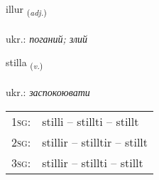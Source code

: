 \documentclass[frontgrid, backgrid]{flacards}\usepackage[]{graphicx}\usepackage[]{xcolor}
\begin{document}
\renewcommand{\flhead}{\vskip5pt \fboxsep=0pt {\small\bfseries\footnotesize Lýsingarorð | прикметник}}
\renewcommand{\fcfoot}{\vskip5pt \fboxsep=0pt \hspace{2pt}{\small\bfseries\footnotesize 2K}}

\renewcommand{\blhead}{\vskip5pt {\small\bfseries\footnotesize Lýsingarorð | прикметник }}
\renewcommand{\bcfoot}{\vskip5pt \hspace{2pt}{\small\bfseries\footnotesize 2K}}


{illur \small{\textsubscript{(\textit{adj.})}} \\[1ex] %
\textphonetic{[ɪtlʏr]} \\
ukr.: \emph{поганий; злий} \\  [2ex]
\renewcommand*{\arraystretch}{0.8}
}

\renewcommand{\flhead}{\vskip5pt \fboxsep=0pt {\small\bfseries\footnotesize Sagnorð | дієслово}}
\renewcommand{\fcfoot}{\vskip5pt \fboxsep=0pt \hspace{2pt}{\small\bfseries\footnotesize 2K}}

\renewcommand{\blhead}{\vskip5pt {\small\bfseries\footnotesize Sagnorð | дієслово }}
\renewcommand{\bcfoot}{\vskip5pt \hspace{2pt}{\small\bfseries\footnotesize 2K}}


{stilla \small{\textsubscript{(\textit{v.})}} \\[1ex] %
\textphonetic{[stɪtla]} \\
ukr.: \emph{заспокоювати} \\  [2ex]
\renewcommand*{\arraystretch}{0.8}
\begin{tabular}{p{1cm}l}
\textsc{1sg}: & stilli -- stillti -- stillt \\ 
\textsc{2sg}: & stillir -- stilltir -- stillt \\ 
\textsc{3sg}: & stillir -- stillti -- stillt \\ 
\end{tabular}
}
\end{document}

